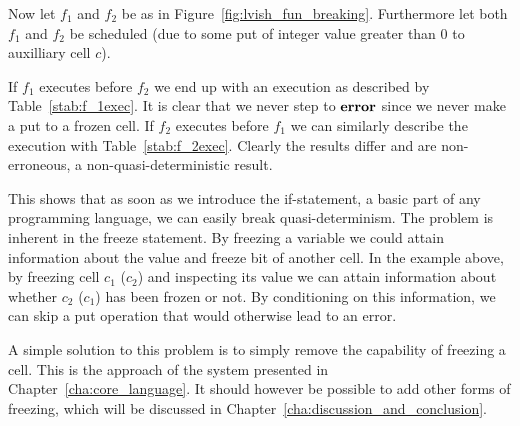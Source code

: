 Now let $f_1$ and $f_2$ be as in Figure~\ref{fig:lvish_fun_breaking}.
Furthermore let both $f_1$ and $f_2$ be scheduled (due to some put of integer
value greater than $0$ to auxilliary cell $c$).

If $f_1$ executes before $f_2$ we end up with an execution as described by
Table~\ref{stab:f_1exec}. It is clear that we never step to $\mbox{{\bf error}}$ since we
never make a put to a frozen cell.  If $f_2$ executes before $f_1$ we can
similarly describe the execution with Table~\ref{stab:f_2exec}. Clearly the
results differ and are non-erroneous, a non-quasi-deterministic result.

This shows that as soon as we introduce the if-statement, a basic part of any
programming language, we can easily break quasi-determinism. The problem is inherent
in the freeze statement. By freezing a variable we could attain information
about the value and freeze bit of another cell. In the example above, by
freezing cell $c_1$ ($c_2$) and inspecting its value we can attain information
about whether $c_2$ ($c_1$) has been frozen or not. By conditioning on this
information, we can skip a put operation that would otherwise lead to an error.

A simple solution to this problem is to simply remove the capability of freezing
a cell. This is the approach of the system presented in
Chapter~\ref{cha:core_language}. It should however be possible to add other
forms of freezing, which will be discussed in
Chapter~\ref{cha:discussion_and_conclusion}.

